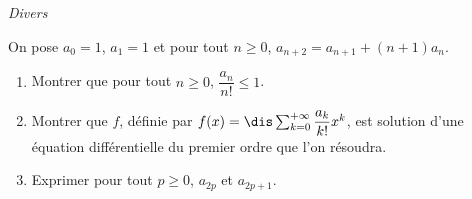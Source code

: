 \documentclass[a4paper,10pt]{report}
\begin{document}
\begin{center}
\textit{{ {\large Divers}}}
\end{center}

\medskip


\begin{Exa} On pose $a_0=1$, $a_1=1$ et pour tout $n \geq 0$, $a_{n+2} = a_{n+1} + (n+1)a_n$.
\begin{enumerate}
\item Montrer que pour tout $n \geq 0$, $\dfrac{a_n}{n!} \leq 1$.
\item Montrer que $f$, définie par $f(x) = \dis \sum_{k=0}^{+ \infty} \dfrac{a_k}{k!}x^k$, est solution d'une équation différentielle du premier ordre que l'on résoudra.
\item Exprimer pour tout $p \geq 0$, $a_{2p}$ et $a_{2p+1}$.
\end{enumerate}
\end{Exa}
\end{document}
